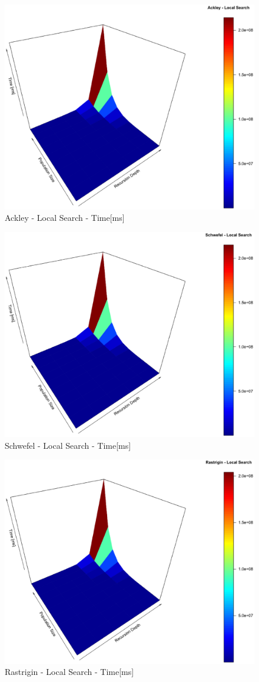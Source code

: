 \documentclass[conference]{IEEEtran}
\begin{document}
\begin{figure}[tbp]
\centering
\includegraphics[width=1.0\hsize,height=0.65\hsize]{fig05.eps}
\caption{Ackley - Local Search - Time[ms]}
\label{fig12}
\end{figure}

\begin{figure}[tbp]
\centering
\includegraphics[width=1.0\hsize,height=0.65\hsize]{fig08.eps}
\caption{Schwefel - Local Search - Time[ms]}
\label{fig13}
\end{figure}

\begin{figure}[tbp]
\centering
\includegraphics[width=1.0\hsize,height=0.65\hsize]{fig11.eps}
\caption{Rastrigin - Local Search - Time[ms]}
\label{fig14}
\end{figure}
\end{document}
